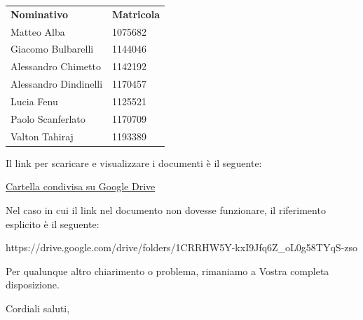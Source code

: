 \documentclass[12pt]{letter}
\begin{document}
\begin{letter}{ }
\begin{center}
   \centering
   \begin{tabular}{ll}
     \textbf{Nominativo}        & \textbf{Matricola} \\
     Matteo Alba                     &  1075682 \\
	 Giacomo Bulbarelli              &  1144046 \\
	 Alessandro Chimetto             &  1142192 \\
	 Alessandro Dindinelli           &  1170457 \\
	 Lucia Fenu                      &  1125521 \\
     Paolo Scanferlato               &  1170709 \\
     Valton Tahiraj                  &  1193389 \\
   \end{tabular}
 \end{center}

Il link per scaricare e visualizzare i documenti è il seguente:

\begin{center}
\href{https://drive.google.com/drive/folders/1CRRHW5Y-kxI9Jfq6Z_oL0g58TYqS-zso}{Cartella condivisa su Google Drive}
\end{center}

Nel caso in cui il link nel documento non dovesse funzionare, il riferimento esplicito è il seguente:
\begin{center}
https://drive.google.com/drive/folders/1CRRHW5Y-kxI9Jfq6Z\_oL0g58TYqS-zso
\end{center}


Per qualunque altro chiarimento o problema, rimaniamo a Vostra completa disposizione.

\closing{Cordiali saluti,}

\vspace{3em}

\end{letter}
\end{document}
